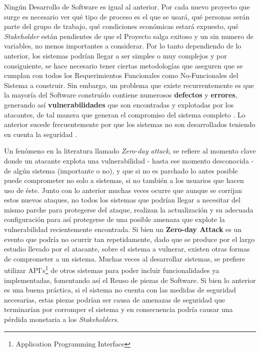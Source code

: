 Ningún Desarrollo de Software es igual al anterior. Por cada nuevo proyecto que surge es necesario ver qué tipo de proceso es el que se usará, qué personas serán parte del grupo de trabajo, qué condiciones económicas estará expuesto, qué \textit{Stakeholder} están pendientes de que el Proyecto salga exitoso y un sin numero de variables, no menos importantes a considerar. Por lo tanto dependiendo de lo anterior, los sistemas podrían llegar a ser simples o muy complejos y por consiguiente, se hace necesario tener ciertas metodologías que aseguren que se cumplan con todos los Requerimientos Funcionales como No-Funcionales del Sistema a construir. Sin embargo, un problema que existe recurrentemente es que la mayoría del Software construído contiene numerosos \textbf{defectos} y \textbf{errores}, generando así \textbf{vulnerabilidades} que son encontradas y explotadas por los atacantes, de tal manera que generan el compromiso del sistema completo \cite{goertzel2007software}. Lo anterior sucede frecuentemente por que los sistemas no son desarrollados teniendo en cuenta la seguridad \cite{Yoder1998, fernandez2004methodology}.

Un fenómeno en la literatura llamado \textit{Zero-day attack}, se refiere al momento clave donde un atacante explota una vulnerabilidad - hasta ese momento desconocida - de algún sistema (importante o no), y que si no es parchado lo antes posible puede comprometer no solo a sistemas, si no también a los usuarios que hacen uso de éste. Junto con lo anterior muchas veces ocurre que aunque se corrijan estos nuevos ataques, no todos los sistemas que podrían llegar a necesitar del mismo parche para protegerse del ataque, realizan la actualización y su adecuada configuración para así protegerse de una posible amenaza que explote la vulnerabilidad recientemente encontrada. Si bien un \textbf{Zero-day Attack} es un evento que podría no ocurrir tan repetidamente, dado que se produce por el largo estudio llevado por el atacante, sobre el sistema a vulnerar, existen otras formas de comprometer a un sistema. Muchas veces al desarrollar sistemas, se prefiere utilizar API's\footnote{Application Programming Interface} de otros sistemas para poder incluir funcionalidades ya implementadas, fomentando así el Reuso de piezas de Software. Si bien lo anterior es una buena práctica, si el sistema no cuenta con las medidas de seguridad necesarias, estas piezas podrían ser causa de amenazas de seguridad que terminarían por corromper el sistema y en consecuencia podría causar una pérdida monetaria a los \textit{Stakeholders}. 

